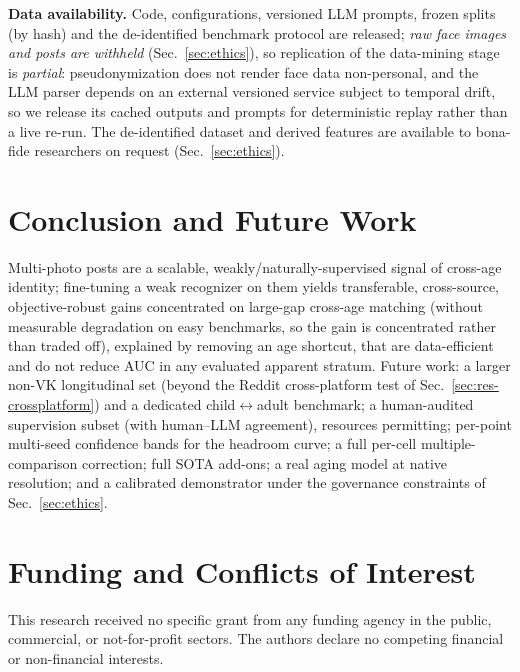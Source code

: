 \documentclass[journal]{IEEEtran}
\begin{document}
\textbf{Data availability.} Code, configurations, versioned LLM prompts, frozen splits (by hash) and the de-identified benchmark protocol are released; \emph{raw face images and posts are withheld} (Sec.~\ref{sec:ethics}), so replication of the data-mining stage is \emph{partial}: pseudonymization does not render face data non-personal, and the LLM parser depends on an external versioned service subject to temporal drift, so we release its cached outputs and prompts for deterministic replay rather than a live re-run. The de-identified dataset and derived features are available to bona-fide researchers on request (Sec.~\ref{sec:ethics}).

\section{Conclusion and Future Work}\label{sec:conclusion}
Multi-photo posts are a scalable, weakly/naturally-supervised signal of cross-age identity; fine-tuning a weak recognizer on them yields transferable, cross-source, objective-robust gains concentrated on large-gap cross-age matching (without measurable degradation on easy benchmarks, so the gain is concentrated rather than traded off), explained by removing an age shortcut, that are data-efficient and do not reduce AUC in any evaluated apparent stratum. Future work: a larger non-VK longitudinal set (beyond the Reddit cross-platform test of Sec.~\ref{sec:res-crossplatform}) and a dedicated child$\leftrightarrow$adult benchmark; a human-audited supervision subset (with human--LLM agreement), resources permitting; per-point multi-seed confidence bands for the headroom curve; a full per-cell multiple-comparison correction; full SOTA add-ons; a real aging model at native resolution; and a calibrated demonstrator under the governance constraints of Sec.~\ref{sec:ethics}.

\section*{Funding and Conflicts of Interest}
This research received no specific grant from any funding agency in the public, commercial, or not-for-profit sectors. The authors declare no competing financial or non-financial interests.



\end{document}
